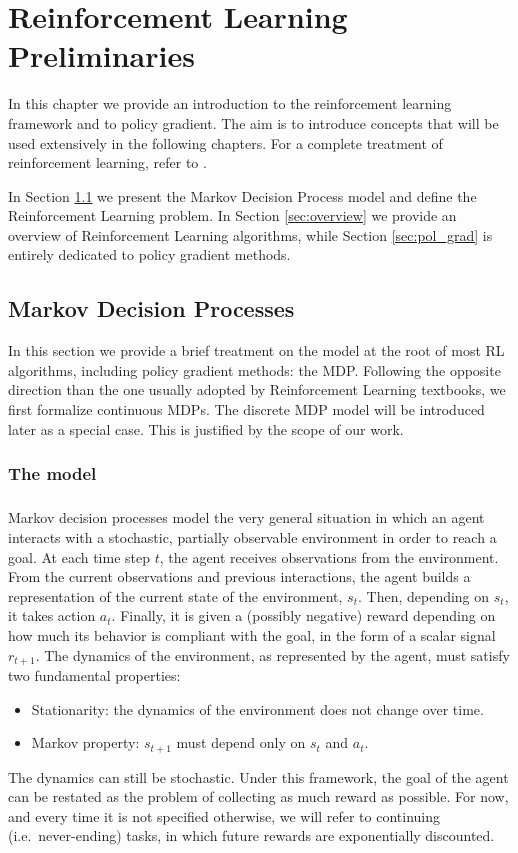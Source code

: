 \chapter{Reinforcement Learning Preliminaries}\label{chap:prelim}
In this chapter we provide an introduction to the reinforcement learning framework and to policy gradient.
The aim is to introduce concepts that will be used extensively in the following chapters. For a complete treatment of reinforcement learning, refer to \cite{Sutton:1998:IRL:551283}.

In Section \ref{sec:MDP} we present the Markov Decision Process model and define the Reinforcement Learning problem. In Section \ref{sec:overview} we provide an overview of Reinforcement Learning algorithms, while Section \ref{sec:pol_grad} is entirely dedicated to policy gradient methods.

\section{Markov Decision Processes}\label{sec:MDP}
In this section we provide a brief treatment on the model at the root of most \ac{RL} algorithms, including policy gradient methods: the \ac{MDP}.  
Following the opposite direction than the one usually adopted by Reinforcement Learning textbooks, we first formalize continuous \ac{MDP}s. The discrete \ac{MDP} model will be introduced later as a special case. This is justified by the scope of our work.

\subsection{The model}
\paragraph{} %
Markov decision processes model the very general situation in which an agent interacts with a stochastic, partially observable environment in order to reach a goal. At each time step $t$, the agent receives observations from the environment. From the current observations and previous interactions, the agent builds a representation of the current state of the environment, $s_t$. Then, depending on $s_t$, it takes action $a_t$. Finally, it is given a (possibly negative) reward depending on how much its behavior is compliant with the goal, in the form of a scalar signal $r_{t+1}$. The dynamics of the environment, as represented by the agent, must satisfy two fundamental properties:
\begin{itemize}
\item Stationarity: the dynamics of the environment does not change over time.
\item Markov property: $s_{t+1}$ must depend only on $s_t$ and $a_t$.
\end{itemize}
The dynamics can still be stochastic.
Under this framework, the goal of the agent can be restated as the problem of collecting as much reward as possible. For now, and every time it is not specified otherwise, we will refer to continuing (i.e.\ never-ending) tasks, in which future rewards are exponentially discounted.

